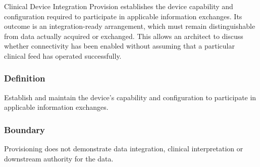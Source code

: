 Clinical Device Integration Provision establishes the device capability and configuration required to participate in applicable information exchanges. Its outcome is an integration-ready arrangement, which must remain distinguishable from data actually acquired or exchanged. This allows an architect to discuss whether connectivity has been enabled without assuming that a particular clinical feed has operated successfully.

\subsubsection*{Definition}

Establish and maintain the device’s capability and configuration to participate in applicable information exchanges.

\subsubsection*{Boundary}

Provisioning does not demonstrate data integration, clinical interpretation or downstream authority for the data.

